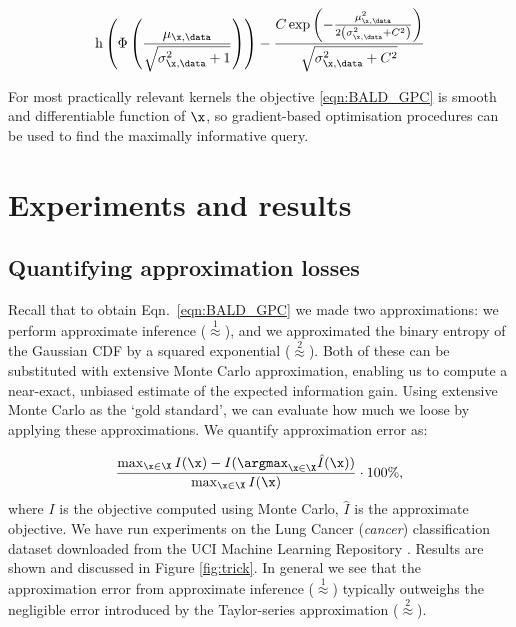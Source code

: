 \begin{equation}
	\mathrm{h} \left( \Phi\left( \frac{\mu_{\x,\data}}{\sqrt{\sigma^2_{\x,\data} + 1}} \right)\right) - \frac{C \exp\left(-\frac{\mu_{\x,\data}^2}{2\left(\sigma_{\x,\data}^2 + C^2\right)}\right)}{\sqrt{\sigma_{\x,\data}^2 + C^2}} \label{eqn:BALD_GPC}
\end{equation}

For most practically relevant kernels the objective \eqref{eqn:BALD_GPC} is smooth and differentiable function of $\x$, so gradient-based optimisation procedures can be used to find the maximally informative query.
	

\section{Experiments and results}

\subsection{Quantifying approximation losses}

Recall that to obtain Eqn.\ \eqref{eqn:BALD_GPC} we made two approximations: we perform approximate inference ({\scriptsize $\stackrel{1}{\approx}$}), and we approximated the binary entropy of the Gaussian CDF by a squared exponential ({\scriptsize $\stackrel{2}{\approx}$}). Both of these can be substituted with extensive Monte Carlo approximation, enabling us to compute a near-exact, unbiased estimate of the expected information gain. Using extensive Monte Carlo as the `gold standard', we can evaluate how much we loose by applying these approximations. We quantify approximation error as: 

\begin{align}
	\frac{ \max_{\x\in\X} I(\x) - I(\argmax_{\x\in\X}\hat{I}(\x)) }{{\max_{\x\in\X}I(\x) }}\cdot 100\%,
\end{align}
where $I$ is the objective computed using Monte Carlo, $\hat{I}$ is the approximate objective. We have run experiments on the Lung Cancer (\emph{cancer}) classification dataset \citep{Hong1991} downloaded from the UCI Machine Learning Repository \citep{UCIRepository}. Results are shown and discussed in Figure \ref{fig:trick}. In general we see that the approximation error from approximate inference ({\scriptsize $\stackrel{1}{\approx}$}) typically outweighs the negligible error introduced by the Taylor-series approximation ({\scriptsize $\stackrel{2}{\approx}$}).

